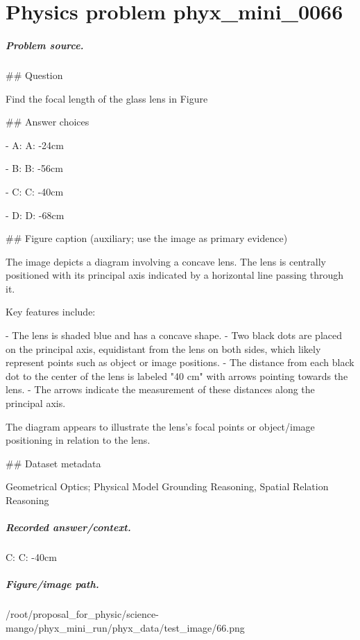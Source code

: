 
\chapter{Physics problem phyx\_mini\_0066}
\label{ch:PhyXMiniProblems_problem_phyx_mini_0066}

\paragraph{Problem source.}
\#\# Question

Find the focal length of the glass lens in Figure

\#\# Answer choices

- A: A: -24cm

- B: B: -56cm

- C: C: -40cm

- D: D: -68cm

\#\# Figure caption (auxiliary; use the image as primary evidence)

The image depicts a diagram involving a concave lens. The lens is centrally positioned with its principal axis indicated by a horizontal line passing through it.

Key features include:

- The lens is shaded blue and has a concave shape.
- Two black dots are placed on the principal axis, equidistant from the lens on both sides, which likely represent points such as object or image positions.
- The distance from each black dot to the center of the lens is labeled "40 cm" with arrows pointing towards the lens.
- The arrows indicate the measurement of these distances along the principal axis.

The diagram appears to illustrate the lens's focal points or object/image positioning in relation to the lens.

\#\# Dataset metadata

Geometrical Optics; Physical Model Grounding Reasoning, Spatial Relation Reasoning

\paragraph{Recorded answer/context.}
C: C: -40cm

\paragraph{Figure/image path.}
/root/proposal\_for\_physic/science-mango/phyx\_mini\_run/phyx\_data/test\_image/66.png

